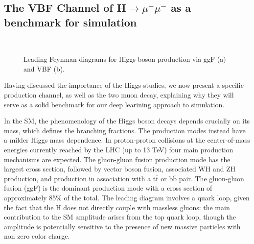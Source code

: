 \subsection{The VBF Channel of H$\rightarrow\mu^+\mu^-$ as a benchmark for simulation}

\begin{figure}
    \myfloatalign
     \quad
     \\
    \caption[ggF and VBF]{Leading Feynman diagrams for Higgs boson production via ggF (a) and VBF (b).}\label{fig:feypro}
\end{figure}
Having discussed the importance of the Higgs studies, we now present a specific production channel, as well as the two muon decay, explaining why they will serve as a solid benchmark for our deep learining approach to simulation.

In the SM, the phenomenology of the Higgs boson decays depends crucially on its mass,
which defines the branching fractions. The production modes instead have a milder Higgs
mass dependence. In proton-proton collisions at the center-of-mass energies currently reached by the LHC
(up to 13 TeV) four main production mechanisms are expected. The gluon-gluon fusion
production mode has the largest cross section, followed by vector boson fusion, associated
WH and ZH production, and production in association with a t$\overline{\text{t}}$  or b$\overline{\text{b}}$ pair. The gluon-gluon fusion (ggF) is the dominant production mode with a cross section of
approximately 85$\%$ of the total. The leading diagram involves a quark loop, given the fact that the H does not directly couple with massless gluons: the main
contribution to the SM amplitude arises from the top quark loop, though the amplitude is
potentially sensitive to the presence of new massive particles with non zero color charge.

